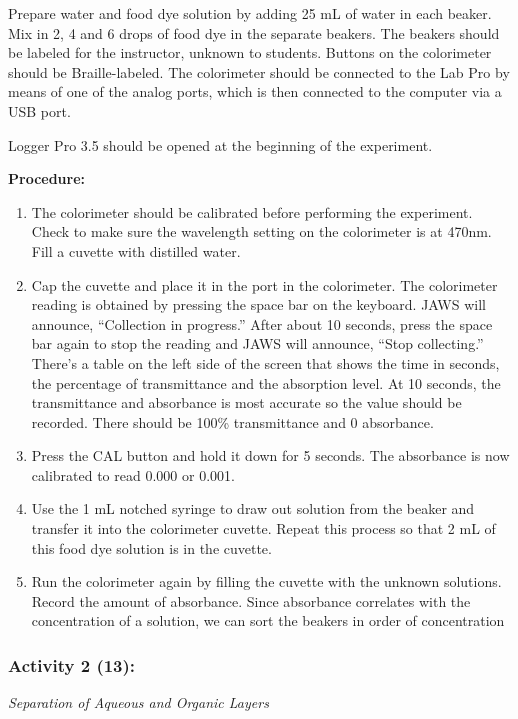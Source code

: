 \documentclass[11.5pt]{sig-alternate} %
\begin{document}
\begin{large}
Prepare water and food dye solution by adding 25 mL of water in each beaker. Mix in 2, 4 and 6 drops of food dye in the separate  beakers. The beakers should be labeled for the instructor, unknown to students. Buttons on the colorimeter should be Braille-labeled. The colorimeter should be connected to the Lab Pro by means of one of the analog ports, which is then connected to the computer via a USB port. 

Logger Pro 3.5 should be opened at the beginning of the experiment.

\textbf{{Procedure: }}
\begin{enumerate}
    \item The colorimeter should be calibrated before performing the experiment. Check to make sure the wavelength setting on the colorimeter is at 470nm. Fill a cuvette with distilled water.
    \item  Cap the cuvette and place it in the port in the colorimeter. The colorimeter reading is obtained by pressing the space bar on the keyboard. JAWS will announce, “Collection in progress.” After about 10 seconds, press the space bar again to stop the reading and JAWS will announce, “Stop collecting.” There’s a table on the left side of the screen that shows the time in seconds, the percentage of transmittance and the absorption level. At 10 seconds, the transmittance and absorbance is most accurate so the value should be recorded. There should be
100\% transmittance and 0 absorbance.
    \item  Press the CAL button and hold it down for 5 seconds. The absorbance is now calibrated to read 0.000 or 0.001.
    \item  Use the 1 mL notched syringe to draw out solution from the beaker and transfer it into the colorimeter cuvette. Repeat this process so that 2 mL of this food dye solution is in the cuvette.
    \item  Run the colorimeter again by filling the cuvette with the unknown solutions. Record the amount of absorbance. Since absorbance correlates with the concentration of a solution, we can sort the beakers in order of concentration
\end{enumerate}

\subsubsection*{Activity 2 (13):}

\textit{Separation of Aqueous and Organic Layers}


\end{large}
\end{document}
